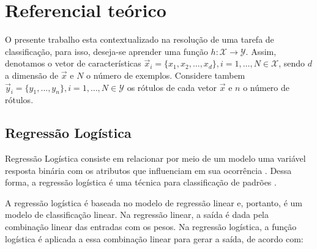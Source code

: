 \documentclass[12pt,a4paper,utf8]{ppgsi}
\begin{document}

\section{Referencial teórico} \label{sec:teoria}

O presente trabalho esta contextualizado na resolução de uma tarefa de classificação, para isso, deseja-se aprender uma função $h : \mathcal{X} \rightarrow \mathcal{Y}$. Assim, denotamos o vetor de características $\vec{x}_i = \{x_1, x_2, \dots, x_d\}, i = 1, \dots, N \in \mathcal{X}$, sendo $d$ a dimensão de $\vec{x}$ e $N$ o número de exemplos. Considere tambem $\vec{y}_i = \{y_1, \dots, y_n\}, i = 1, \dots, N \in \mathcal{Y}$ os rótulos de cada vetor $\vec{x}$ e $n$ o número de rótulos.

\subsection{Regressão Logística} \label{sec:log}

Regressão Logística consiste em relacionar por meio de um modelo uma variável resposta binária com os atributos que influenciam em sua ocorrência \citep{hair2007analise}. Dessa forma, a regressão logística é uma técnica para classificação de padrões \citep{Murphy2012}.


A regressão logística é baseada no modelo de regressão linear e, portanto, é um modelo de classificação linear. Na regressão linear, a saída é dada pela combinação linear das entradas com os pesos. Na regressão logística, a função logística é aplicada a essa combinação linear para gerar a saída, de acordo com:
\end{document}

